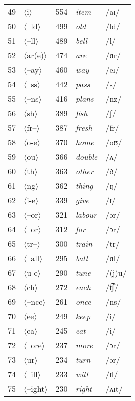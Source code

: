 \begin{longtable}{lllll}
49 & $\langle$i$\rangle$ & 554 & \textit{item} & /aɪ/ \\
50 & $\langle$--ld$\rangle$ & 499 & \textit{old} & /ld/ \\
51 & $\langle$--ll$\rangle$ & 489 & \textit{bell} & /l/ \\
52 & $\langle$ar(e)$\rangle$ & 474 & \textit{are} & /ɑr/ \\
53 & $\langle$--ay$\rangle$ & 460 & \textit{way} & /eɪ/ \\
54 & $\langle$--ss$\rangle$ & 442 & \textit{pass} & /s/ \\
55 & $\langle$--ns$\rangle$ & 416 & \textit{plans} & /nz/ \\
56 & $\langle$sh$\rangle$ & 389 & \textit{fish} & /ʃ/ \\
57 & $\langle$fr--$\rangle$ & 387 & \textit{fresh} & /fr/ \\
58 & $\langle$o-e$\rangle$ & 370 & \textit{home} & /oʊ/ \\
59 & $\langle$ou$\rangle$ & 366 & \textit{double} & /ʌ/ \\
60 & $\langle$th$\rangle$ & 363 & \textit{other} & /ð/ \\
61 & $\langle$ng$\rangle$ & 362 & \textit{thing} & /ŋ/ \\
62 & $\langle$i-e$\rangle$ & 339 & \textit{give} & /ɪ/ \\
63 & $\langle$--or$\rangle$ & 321 & \textit{labour} & /ər/ \\
64 & $\langle$--or$\rangle$ & 312 & \textit{for} & /ɔr/ \\
65 & $\langle$tr--$\rangle$ & 300 & \textit{train} & /tr/ \\
66 & $\langle$--all$\rangle$ & 295 & \textit{ball} & /ɑl/ \\
67 & $\langle$u-e$\rangle$ & 290 & \textit{tune} & /(j)u/ \\
68 & $\langle$ch$\rangle$ & 272 & \textit{each} & /t͡ʃ/ \\
69 & $\langle$--nce$\rangle$ & 261 & \textit{once} & /ns/ \\
70 & $\langle$ee$\rangle$ & 249 & \textit{keep} & /i/ \\
71 & $\langle$ea$\rangle$ & 245 & \textit{eat} & /i/ \\
72 & $\langle$--ore$\rangle$ & 237 & \textit{more} & /ɔr/ \\
73 & $\langle$ur$\rangle$ & 234 & \textit{turn} & /ər/ \\
74 & $\langle$--ill$\rangle$ & 233 & \textit{will} & /ɪl/ \\
75 & $\langle$--ight$\rangle$ & 230 & \textit{right} & /ʌɪt/ \\

\end{longtable}
